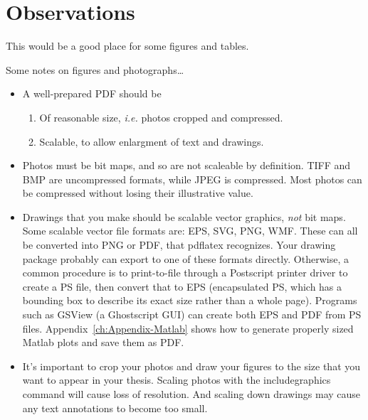 \newcommand{\package}[1]{\textbf{#1}} %
\newcommand{\cmmd}[1]{\textbackslash\texttt{#1}} %


\chapter{Observations}

This would be a good place for some figures and tables.

Some notes on figures and photographs\ldots

\begin{itemize}
\item A well-prepared PDF should be 
  \begin{enumerate}
    \item Of reasonable size, {\it i.e.} photos cropped and compressed.
    \item Scalable, to allow enlargment of text and drawings. 
  \end{enumerate} 
\item Photos must be bit maps, and so are not scaleable by definition. TIFF and
BMP are uncompressed formats, while JPEG is compressed. Most photos can be
compressed without losing their illustrative value.
\item Drawings that you make should be scalable vector graphics, \emph{not} 
bit maps. Some scalable vector file formats are: EPS, SVG, PNG, WMF. These can
all be converted into PNG or PDF, that pdflatex recognizes. Your drawing 
package probably can export to one of these formats directly. Otherwise, a 
common procedure is to print-to-file through a Postscript printer driver to 
create a PS file, then convert that to EPS (encapsulated PS, which has a 
bounding box to describe its exact size rather than a whole page). 
Programs such as GSView (a Ghostscript GUI) can create both EPS and PDF from PS files.
Appendix~\ref{ch:Appendix-Matlab} shows how to generate properly sized Matlab plots and save them as PDF.
\item It's important to crop your photos and draw your figures to the size that
you want to appear in your thesis. Scaling photos with the 
includegraphics command will cause loss of resolution. And scaling down 
drawings may cause any text annotations to become too small.
\end{itemize}
 
